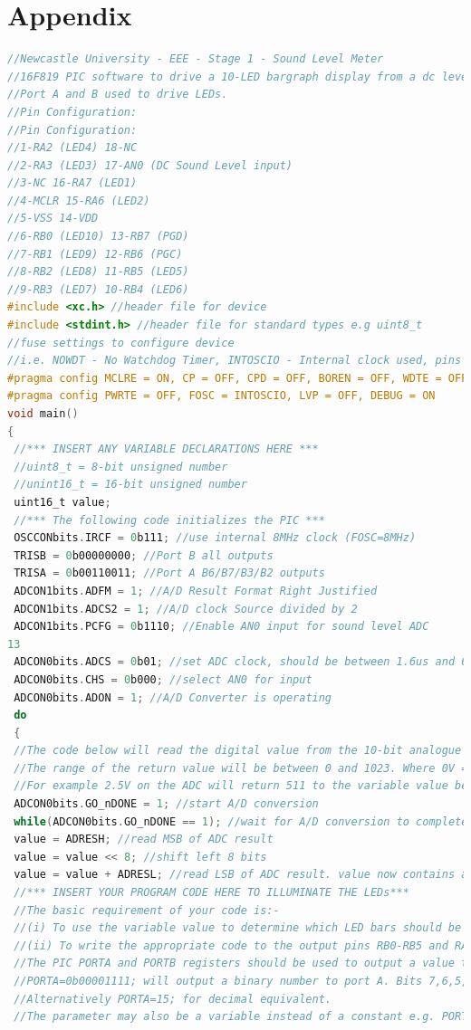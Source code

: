 \documentclass[10pt,a4paper]{article}
\begin{document}
\section{Appendix}
\begin{lstlisting}[caption={PIC Code},label={lst:code},language= C]
//Newcastle University - EEE - Stage 1 - Sound Level Meter
//16F819 PIC software to drive a 10-LED bargraph display from a dc level on ADC input 0 (AN0).
//Port A and B used to drive LEDs.
//Pin Configuration:
//Pin Configuration:
//1-RA2 (LED4) 18-NC
//2-RA3 (LED3) 17-AN0 (DC Sound Level input)
//3-NC 16-RA7 (LED1)
//4-MCLR 15-RA6 (LED2)
//5-VSS 14-VDD
//6-RB0 (LED10) 13-RB7 (PGD)
//7-RB1 (LED9) 12-RB6 (PGC)
//8-RB2 (LED8) 11-RB5 (LED5)
//9-RB3 (LED7) 10-RB4 (LED6)
#include <xc.h> //header file for device
#include <stdint.h> //header file for standard types e.g uint8_t
//fuse settings to configure device
//i.e. NOWDT - No Watchdog Timer, INTOSCIO - Internal clock used, pins available for I/O
#pragma config MCLRE = ON, CP = OFF, CPD = OFF, BOREN = OFF, WDTE = OFF
#pragma config PWRTE = OFF, FOSC = INTOSCIO, LVP = OFF, DEBUG = ON
void main()
{
 //*** INSERT ANY VARIABLE DECLARATIONS HERE ***
 //uint8_t = 8-bit unsigned number
 //unint16_t = 16-bit unsigned number
 uint16_t value;
 //*** The following code initializes the PIC ***
 OSCCONbits.IRCF = 0b111; //use internal 8MHz clock (FOSC=8MHz)
 TRISB = 0b00000000; //Port B all outputs
 TRISA = 0b00110011; //Port A B6/B7/B3/B2 outputs
 ADCON1bits.ADFM = 1; //A/D Result Format Right Justified
 ADCON1bits.ADCS2 = 1; //A/D clock Source divided by 2
 ADCON1bits.PCFG = 0b1110; //Enable AN0 input for sound level ADC
13
 ADCON0bits.ADCS = 0b01; //set ADC clock, should be between 1.6us and 6.4us (1/8MHz x 16 = 2us)
 ADCON0bits.CHS = 0b000; //select AN0 for input
 ADCON0bits.ADON = 1; //A/D Converter is operating
 do
 {
 //The code below will read the digital value from the 10-bit analogue to digital converter.
 //The range of the return value will be between 0 and 1023. Where 0V = 0 and 5V = 1023.
 //For example 2.5V on the ADC will return 511 to the variable value below.
 ADCON0bits.GO_nDONE = 1; //start A/D conversion
 while(ADCON0bits.GO_nDONE == 1); //wait for A/D conversion to complete
 value = ADRESH; //read MSB of ADC result
 value = value << 8; //shift left 8 bits
 value = value + ADRESL; //read LSB of ADC result. value now contains a 10-bit ADC number
 //*** INSERT YOUR PROGRAM CODE HERE TO ILLUMINATE THE LEDs***
 //The basic requirement of your code is:-
 //(i) To use the variable value to determine which LED bars should be switched on.
 //(ii) To write the appropriate code to the output pins RB0-RB5 and RA2,RA3,RA6,RA7.
 //The PIC PORTA and PORTB registers should be used to output a value to the Port pins
 //PORTA=0b00001111; will output a binary number to port A. Bits 7,6,5,4=0 and Bits 3,2,1,0=1.
 //Alternatively PORTA=15; for decimal equivalent.
 //The parameter may also be a variable instead of a constant e.g. PORTA=value;
 

\end{lstlisting}
\end{document}
